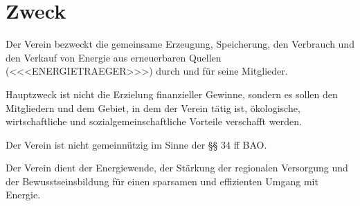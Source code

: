 \documentclass[a4paper,11pt]{article}
\begin{document}
\section{Zweck}\label{par:zweck}
\begin{absaetze}
  \item Der Verein bezweckt die gemeinsame Erzeugung, Speicherung, den Verbrauch und den Verkauf von Energie aus
        erneuerbaren Quellen (<<<ENERGIETRAEGER>>>) durch und für seine Mitglieder.
  \item Hauptzweck ist nicht die Erzielung finanzieller Gewinne, sondern es sollen den Mitgliedern und dem Gebiet, in
        dem der Verein tätig ist, ökologische, wirtschaftliche und sozialgemeinschaftliche Vorteile verschafft werden.
  \item Der Verein ist nicht gemeinnützig im Sinne der §§ 34 ff BAO.\label{abs:nichtgemeinnuetzig}
  \item Der Verein dient der Energiewende, der Stärkung der regionalen Versorgung und der Bewusstseinsbildung für einen
        sparsamen und effizienten Umgang mit Energie.
\end{absaetze}

\end{document}
